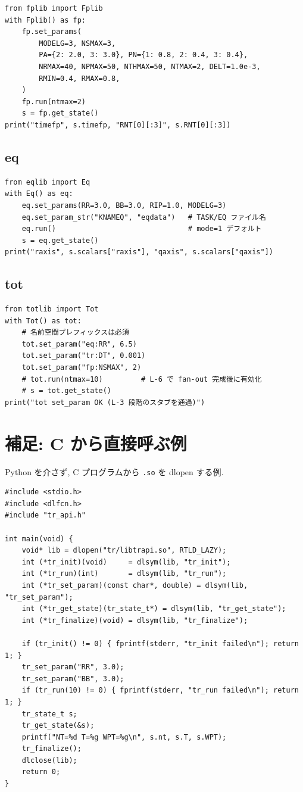 \documentclass[11pt,a4paper]{report}
\begin{document}
\begin{lstlisting}[style=py]
from fplib import Fplib
with Fplib() as fp:
    fp.set_params(
        MODELG=3, NSMAX=3,
        PA={2: 2.0, 3: 3.0}, PN={1: 0.8, 2: 0.4, 3: 0.4},
        NRMAX=40, NPMAX=50, NTHMAX=50, NTMAX=2, DELT=1.0e-3,
        RMIN=0.4, RMAX=0.8,
    )
    fp.run(ntmax=2)
    s = fp.get_state()
print("timefp", s.timefp, "RNT[0][:3]", s.RNT[0][:3])
\end{lstlisting}

\section{eq}

\begin{lstlisting}[style=py]
from eqlib import Eq
with Eq() as eq:
    eq.set_params(RR=3.0, BB=3.0, RIP=1.0, MODELG=3)
    eq.set_param_str("KNAMEQ", "eqdata")   # TASK/EQ ファイル名
    eq.run()                               # mode=1 デフォルト
    s = eq.get_state()
print("raxis", s.scalars["raxis"], "qaxis", s.scalars["qaxis"])
\end{lstlisting}

\section{tot}

\begin{lstlisting}[style=py]
from totlib import Tot
with Tot() as tot:
    # 名前空間プレフィックスは必須
    tot.set_param("eq:RR", 6.5)
    tot.set_param("tr:DT", 0.001)
    tot.set_param("fp:NSMAX", 2)
    # tot.run(ntmax=10)         # L-6 で fan-out 完成後に有効化
    # s = tot.get_state()
print("tot set_param OK (L-3 段階のスタブを通過)")
\end{lstlisting}

\chapter{補足: C から直接呼ぶ例}

Python を介さず, C プログラムから \texttt{.so} を dlopen する例.

\begin{lstlisting}[style=c,caption={C ドライバの最短例 (tr 版)}]
#include <stdio.h>
#include <dlfcn.h>
#include "tr_api.h"

int main(void) {
    void* lib = dlopen("tr/libtrapi.so", RTLD_LAZY);
    int (*tr_init)(void)     = dlsym(lib, "tr_init");
    int (*tr_run)(int)       = dlsym(lib, "tr_run");
    int (*tr_set_param)(const char*, double) = dlsym(lib, "tr_set_param");
    int (*tr_get_state)(tr_state_t*) = dlsym(lib, "tr_get_state");
    int (*tr_finalize)(void) = dlsym(lib, "tr_finalize");

    if (tr_init() != 0) { fprintf(stderr, "tr_init failed\n"); return 1; }
    tr_set_param("RR", 3.0);
    tr_set_param("BB", 3.0);
    if (tr_run(10) != 0) { fprintf(stderr, "tr_run failed\n"); return 1; }
    tr_state_t s;
    tr_get_state(&s);
    printf("NT=%d T=%g WPT=%g\n", s.nt, s.T, s.WPT);
    tr_finalize();
    dlclose(lib);
    return 0;
}
\end{lstlisting}
\end{document}
